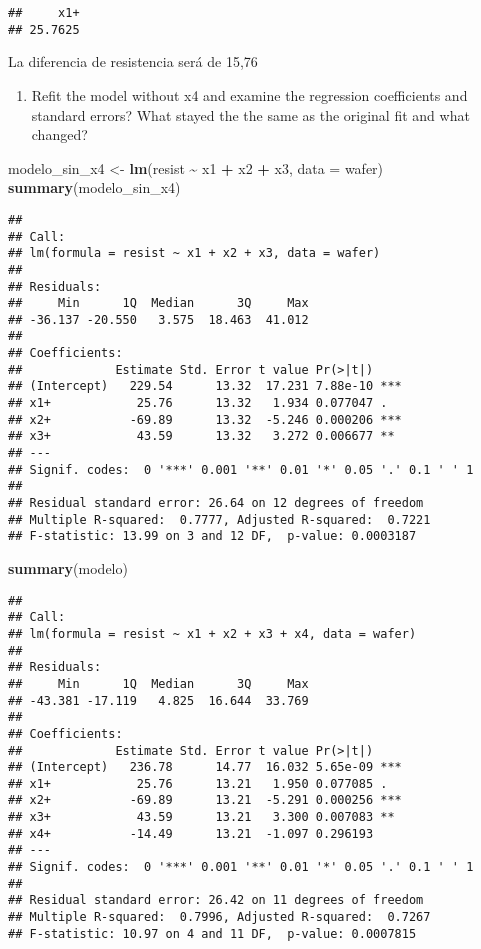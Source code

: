 \documentclass[
]{article}
\newenvironment{Shaded}{\begin{snugshade}}{\end{snugshade}}
\newcommand{\AttributeTok}[1]{\textcolor[rgb]{0.13,0.29,0.53}{#1}}
\newcommand{\FunctionTok}[1]{\textcolor[rgb]{0.13,0.29,0.53}{\textbf{#1}}}
\newcommand{\NormalTok}[1]{#1}
\newcommand{\OtherTok}[1]{\textcolor[rgb]{0.56,0.35,0.01}{#1}}
\newcommand{\SpecialCharTok}[1]{\textcolor[rgb]{0.81,0.36,0.00}{\textbf{#1}}}
\providecommand{\tightlist}{%
  \setlength{\itemsep}{0pt}\setlength{\parskip}{0pt}}
\begin{document}
\begin{verbatim}
##     x1+ 
## 25.7625
\end{verbatim}

La diferencia de resistencia será de 15,76

\begin{enumerate}
\def\labelenumi{(\alph{enumi})}
\setcounter{enumi}{3}
\tightlist
\item
  Refit the model without x4 and examine the regression coefficients and
  standard errors? What stayed the the same as the original fit and what
  changed?
\end{enumerate}

\begin{Shaded}
\begin{Highlighting}[]
\NormalTok{modelo\_sin\_x4 }\OtherTok{\textless{}{-}} \FunctionTok{lm}\NormalTok{(resist }\SpecialCharTok{\textasciitilde{}}\NormalTok{ x1 }\SpecialCharTok{+}\NormalTok{ x2 }\SpecialCharTok{+}\NormalTok{ x3, }\AttributeTok{data =}\NormalTok{ wafer)}
\FunctionTok{summary}\NormalTok{(modelo\_sin\_x4)}
\end{Highlighting}
\end{Shaded}

\begin{verbatim}
## 
## Call:
## lm(formula = resist ~ x1 + x2 + x3, data = wafer)
## 
## Residuals:
##     Min      1Q  Median      3Q     Max 
## -36.137 -20.550   3.575  18.463  41.012 
## 
## Coefficients:
##             Estimate Std. Error t value Pr(>|t|)    
## (Intercept)   229.54      13.32  17.231 7.88e-10 ***
## x1+            25.76      13.32   1.934 0.077047 .  
## x2+           -69.89      13.32  -5.246 0.000206 ***
## x3+            43.59      13.32   3.272 0.006677 ** 
## ---
## Signif. codes:  0 '***' 0.001 '**' 0.01 '*' 0.05 '.' 0.1 ' ' 1
## 
## Residual standard error: 26.64 on 12 degrees of freedom
## Multiple R-squared:  0.7777, Adjusted R-squared:  0.7221 
## F-statistic: 13.99 on 3 and 12 DF,  p-value: 0.0003187
\end{verbatim}

\begin{Shaded}
\begin{Highlighting}[]
\FunctionTok{summary}\NormalTok{(modelo)}
\end{Highlighting}
\end{Shaded}

\begin{verbatim}
## 
## Call:
## lm(formula = resist ~ x1 + x2 + x3 + x4, data = wafer)
## 
## Residuals:
##     Min      1Q  Median      3Q     Max 
## -43.381 -17.119   4.825  16.644  33.769 
## 
## Coefficients:
##             Estimate Std. Error t value Pr(>|t|)    
## (Intercept)   236.78      14.77  16.032 5.65e-09 ***
## x1+            25.76      13.21   1.950 0.077085 .  
## x2+           -69.89      13.21  -5.291 0.000256 ***
## x3+            43.59      13.21   3.300 0.007083 ** 
## x4+           -14.49      13.21  -1.097 0.296193    
## ---
## Signif. codes:  0 '***' 0.001 '**' 0.01 '*' 0.05 '.' 0.1 ' ' 1
## 
## Residual standard error: 26.42 on 11 degrees of freedom
## Multiple R-squared:  0.7996, Adjusted R-squared:  0.7267 
## F-statistic: 10.97 on 4 and 11 DF,  p-value: 0.0007815
\end{verbatim}
\end{document}
